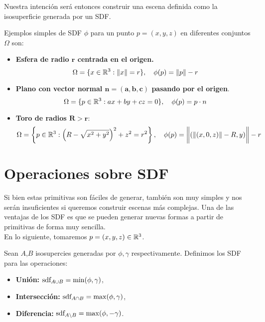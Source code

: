 Nuestra intención será entonces construir una escena definida como la isosuperficie generada por un SDF.

\begin{ejemplo}
    Ejemplos simples de SDF $\phi$ para un punto $p=(x,y,z)$ en diferentes conjuntos $\Omega$ son:
    \begin{itemize}
        \item \textbf{Esfera de radio $\boldsymbol{r}$ centrada en el origen.}
        \begin{equation*}
            \Omega=\{x\in \mathbb{R}^3 : \Vert x\Vert = r\},\quad \phi(p) = \Vert p\Vert - r
        \end{equation*}
        \item \textbf{Plano con vector normal $\boldsymbol{n=(a,b,c)}$ pasando por el origen}.
        \begin{equation*}
            \Omega=\{p\in\mathbb{R}^3 : ax+by+cz = 0\},\quad \phi(p) = p\cdot n
        \end{equation*}
        \item \textbf{Toro de radios $\boldsymbol{R>r}$}:
        \begin{equation*}
            \Omega=\left\{p\in \mathbb{R}^3 : \left(R-\sqrt{x^2+y^2}\right)^2 + z^2 = r^2\right\},\quad \phi(p)= \bigg\Vert (\Vert(x,0,z)\Vert - R, y) \bigg\Vert - r
        \end{equation*}
    \end{itemize}
\end{ejemplo}

\section{Operaciones sobre SDF}
Si bien estas primitivas son fáciles de generar, también son muy simples y nos serán insuficientes si queremos construir escenas más complejas. Una de las ventajas de los SDF es que se pueden generar nuevas formas a partir de primitivas de forma muy sencilla.\\

En lo siguiente, tomaremos $p=(x,y,z)\in\mathbb{R}^3$.

\begin{proposicion}\label{p:boolean}
    Sean $A$,$B$ isosupercies generadas por $\phi,\gamma$ respectivamente. Definimos los SDF para las operaciones:
    \begin{itemize}
        \item \textbf{Unión: } $\text{sdf}_{A\cup B} = \min(\phi, \gamma)$,
        \item \textbf{Intersección: } $\text{sdf}_{A\cap B} = \max(\phi, \gamma)$,
        \item \textbf{Diferencia: } $\text{sdf}_{A\setminus B} = \max(\phi, -\gamma)$.
    \end{itemize}
\end{proposicion}

